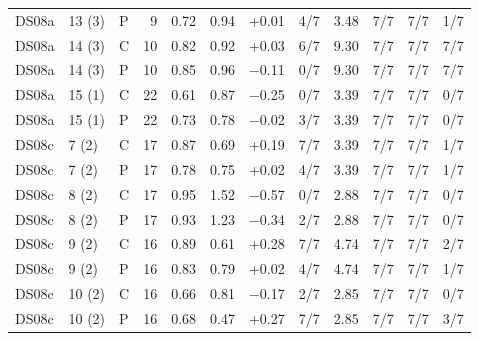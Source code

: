 \documentclass[10pt]{article}
\begin{document}
{\begin{longtable}{lllrrrrrrrrr}
DS08a & 13 (3) & P & 9 & 0.72 & 0.94 & +0.01 & 4/7 & 3.48 & 7/7 & 7/7 & 1/7 \\
DS08a & 14 (3) & C & 10 & 0.82 & 0.92 & +0.03 & 6/7 & 9.30 & 7/7 & 7/7 & 7/7 \\
DS08a & 14 (3) & P & 10 & 0.85 & 0.96 & −0.11 & 0/7 & 9.30 & 7/7 & 7/7 & 7/7 \\
DS08a & 15 (1) & C & 22 & 0.61 & 0.87 & −0.25 & 0/7 & 3.39 & 7/7 & 7/7 & 0/7 \\
DS08a & 15 (1) & P & 22 & 0.73 & 0.78 & −0.02 & 3/7 & 3.39 & 7/7 & 7/7 & 0/7 \\
\midrule
DS08c & 7 (2) & C & 17 & 0.87 & 0.69 & +0.19 & 7/7 & 3.39 & 7/7 & 7/7 & 1/7 \\
DS08c & 7 (2) & P & 17 & 0.78 & 0.75 & +0.02 & 4/7 & 3.39 & 7/7 & 7/7 & 1/7 \\
DS08c & 8 (2) & C & 17 & 0.95 & 1.52 & −0.57 & 0/7 & 2.88 & 7/7 & 7/7 & 0/7 \\
DS08c & 8 (2) & P & 17 & 0.93 & 1.23 & −0.34 & 2/7 & 2.88 & 7/7 & 7/7 & 0/7 \\
DS08c & 9 (2) & C & 16 & 0.89 & 0.61 & +0.28 & 7/7 & 4.74 & 7/7 & 7/7 & 2/7 \\
DS08c & 9 (2) & P & 16 & 0.83 & 0.79 & +0.02 & 4/7 & 4.74 & 7/7 & 7/7 & 1/7 \\
DS08c & 10 (2) & C & 16 & 0.66 & 0.81 & −0.17 & 2/7 & 2.85 & 7/7 & 7/7 & 0/7 \\
DS08c & 10 (2) & P & 16 & 0.68 & 0.47 & +0.27 & 7/7 & 2.85 & 7/7 & 7/7 & 3/7 \\
\end{longtable}
\vspace{-0.6em}
}
\end{document}
